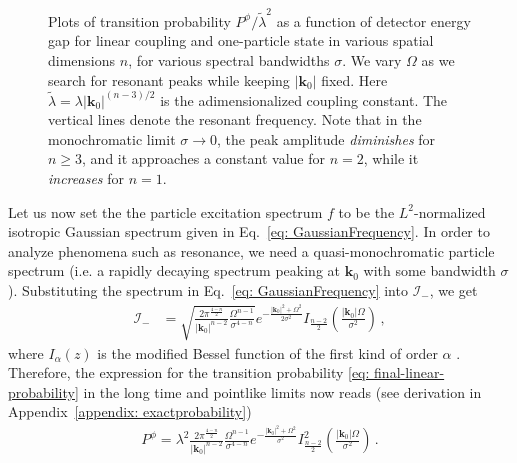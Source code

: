 \documentclass[prd,twocolumn,superscriptaddress,nofootinbib,floatfix,amsmath,amssymb]{revtex4-2}
\newcommand{\bk}{{\bm{k}}}
\begin{document}
\begin{figure}[tp]
        \caption{
        Plots of transition probability $P^\phi/\tilde{\lambda}^2$ as a function of detector energy gap for linear coupling and one-particle state in various spatial dimensions $n$, for various  spectral bandwidths $\sigma$. We vary $\Omega$ as we search for resonant peaks while keeping $|\bk_0|$ fixed. Here $\tilde\lambda = \lambda |\bk_0|^{(n-3)/2}$ is the adimensionalized coupling constant. The vertical lines denote the resonant frequency. Note that in the monochromatic limit $\sigma\to 0$, the peak amplitude \textit{diminishes}  for $n\geq 3$, and it approaches a constant value for $n=2$, while it \textit{increases} for $n=1$.}
        \label{fig: linear_resonance1}
    \end{figure}
    
    Let us now set the the particle excitation spectrum $f$ to be the $L^2$-normalized isotropic Gaussian spectrum given in Eq.~\eqref{eq: GaussianFrequency}. 
    In order to analyze phenomena such as resonance, we need a quasi-monochromatic particle spectrum (i.e. a rapidly decaying spectrum peaking at $\bk_0$ with some bandwidth $\sigma$). Substituting the spectrum in Eq.~\eqref{eq: GaussianFrequency} into $\mathcal{I}_-$, we get
    \begin{align}
        \mathcal{I}_- &= \sqrt{\frac{2\pi ^{\frac{4-n}{2}}}{|\bk_0|^{n-2}} \frac{\Omega ^{n-1}}{\sigma^{4-n}}} e^{-\frac{|\bk_0|^2+\Omega ^2}{2\sigma ^2}} I_{\frac{n-2}{2}}\left(\frac{|\bk_0| \Omega }{\sigma ^2}\right)\,,
    \end{align}
    where $I_\alpha(z)$ is the modified Bessel function of the first kind of order $\alpha$ \cite{NIST:DLMF}. 
    Therefore, the expression for the transition probability \eqref{eq: final-linear-probability} in the long time and pointlike limits now reads (see derivation in Appendix~\ref{appendix: exactprobability})
    \begin{align}
        P^\phi = 
        \lambda^2 \frac{2\pi ^{\frac{4-n}{2}}}{|\bk_0|^{n-2}} \frac{\Omega ^{n-1}}{\sigma^{4-n}} e^{-\frac{|\bk_0|^2+\Omega ^2}{\sigma ^2}} I^2_{\frac{n-2}{2}}\left(\frac{|\bk_0| \Omega }{\sigma ^2}\right)\,.
        \label{eq: prob-linear-gaussian-final}
    \end{align}
\end{document}
